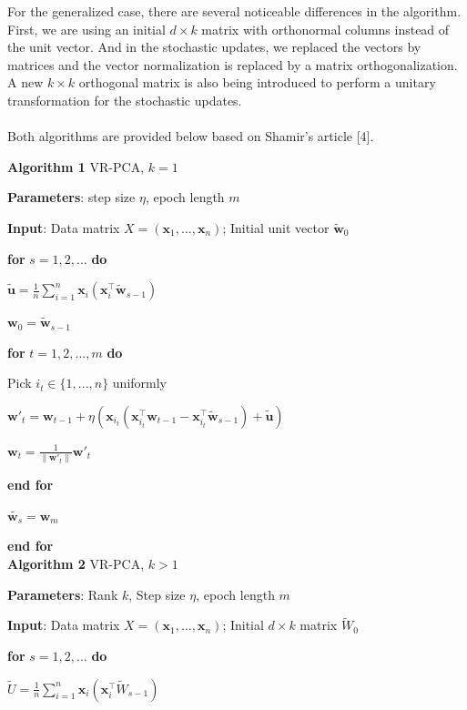 \documentclass{article}
\begin{document}
For the generalized case, there are several noticeable differences in the algorithm. First, we are using an initial $d\times k$ matrix with orthonormal columns instead of the unit vector. And in the stochastic updates, we replaced the vectors by matrices and the vector normalization is replaced by a matrix orthogonalization. A new $k\times k$ orthogonal matrix is also being introduced to perform a unitary transformation for the stochastic updates. \\ \\
Both algorithms are provided below based on Shamir’s article [4]. \clearpage

\textbf{Algorithm 1} VR-PCA, $k=1$

\textbf{Parameters}: step size $\eta$, epoch length $m$

\textbf{Input}: Data matrix $X=(\textbf{x}_1, ..., \textbf{x}_n)$; Initial unit vector $\tilde{\textbf{w}}_0$

\textbf{for} $s=1,2,...$ \textbf{do}

    \quad$\tilde{\textbf{u}} = \frac{1}{n}\sum^n_{i=1} \textbf{x}_i(\textbf{x}_i^\top \tilde{\textbf{w}}_{s-1})$
  
    \quad$\textbf{w}_0 = \tilde{\textbf{w}}_{s-1}$  
  
        \quad\textbf{for} $t = 1,2,...,m$ \textbf{do}  
        
        \quad\quad\quad Pick $i_t \in \{1,...,n\}$ uniformly  
            
         \quad\quad\quad $\textbf{w}'_t = \textbf{w}_{t-1}+\eta (\textbf{x}_{i_t}(\textbf{x}^\top_{i_t}\textbf{w}_{t-1}-\textbf{x}^\top_{i_t}\tilde{\textbf{w}}_{s-1}) + \tilde{\textbf{u}})$ 

         \quad\quad\quad $\textbf{w}_t = \frac{1}{\|\textbf{w}'_t\|}\textbf{w}'_t$  

     \quad\textbf{end for}  

     \quad$\tilde{\textbf{w}_s} = \textbf{w}_m$  

\textbf{end for}\\

\textbf{Algorithm 2} VR-PCA, $k>1$

\textbf{Parameters}: Rank $k$, Step size $\eta$, epoch length $m$

\textbf{Input}: Data matrix $X=(\textbf{x}_1, ..., \textbf{x}_n)$; Initial $d\times k$ matrix $\tilde{W}_0$

\textbf{for} $s=1,2,...$ \textbf{do}

    \quad$\tilde{U} = \frac{1}{n}\sum^n_{i=1} \textbf{x}_i(\textbf{x}_i^\top \tilde{W}_{s-1})$
  
\end{document}
